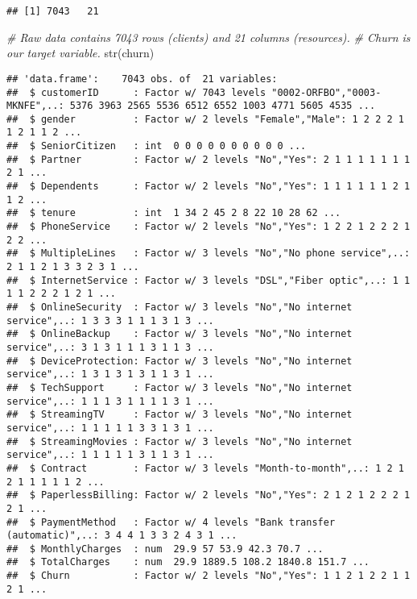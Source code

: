 \documentclass[
]{article}
\newenvironment{Shaded}{\begin{snugshade}}{\end{snugshade}}
\newcommand{\CommentTok}[1]{\textcolor[rgb]{0.56,0.35,0.01}{\textit{#1}}}
\newcommand{\FunctionTok}[1]{\textcolor[rgb]{0.00,0.00,0.00}{#1}}
\newcommand{\NormalTok}[1]{#1}
\begin{document}
\begin{verbatim}
## [1] 7043   21
\end{verbatim}

\begin{Shaded}
\begin{Highlighting}[]
\CommentTok{\# Raw data contains 7043 rows (clients) and 21 columns (resources). }
\CommentTok{\# \textquotesingle{}Churn\textquotesingle{} is our target variable.}
\FunctionTok{str}\NormalTok{(churn)}
\end{Highlighting}
\end{Shaded}

\begin{verbatim}
## 'data.frame':    7043 obs. of  21 variables:
##  $ customerID      : Factor w/ 7043 levels "0002-ORFBO","0003-MKNFE",..: 5376 3963 2565 5536 6512 6552 1003 4771 5605 4535 ...
##  $ gender          : Factor w/ 2 levels "Female","Male": 1 2 2 2 1 1 2 1 1 2 ...
##  $ SeniorCitizen   : int  0 0 0 0 0 0 0 0 0 0 ...
##  $ Partner         : Factor w/ 2 levels "No","Yes": 2 1 1 1 1 1 1 1 2 1 ...
##  $ Dependents      : Factor w/ 2 levels "No","Yes": 1 1 1 1 1 1 2 1 1 2 ...
##  $ tenure          : int  1 34 2 45 2 8 22 10 28 62 ...
##  $ PhoneService    : Factor w/ 2 levels "No","Yes": 1 2 2 1 2 2 2 1 2 2 ...
##  $ MultipleLines   : Factor w/ 3 levels "No","No phone service",..: 2 1 1 2 1 3 3 2 3 1 ...
##  $ InternetService : Factor w/ 3 levels "DSL","Fiber optic",..: 1 1 1 1 2 2 2 1 2 1 ...
##  $ OnlineSecurity  : Factor w/ 3 levels "No","No internet service",..: 1 3 3 3 1 1 1 3 1 3 ...
##  $ OnlineBackup    : Factor w/ 3 levels "No","No internet service",..: 3 1 3 1 1 1 3 1 1 3 ...
##  $ DeviceProtection: Factor w/ 3 levels "No","No internet service",..: 1 3 1 3 1 3 1 1 3 1 ...
##  $ TechSupport     : Factor w/ 3 levels "No","No internet service",..: 1 1 1 3 1 1 1 1 3 1 ...
##  $ StreamingTV     : Factor w/ 3 levels "No","No internet service",..: 1 1 1 1 1 3 3 1 3 1 ...
##  $ StreamingMovies : Factor w/ 3 levels "No","No internet service",..: 1 1 1 1 1 3 1 1 3 1 ...
##  $ Contract        : Factor w/ 3 levels "Month-to-month",..: 1 2 1 2 1 1 1 1 1 2 ...
##  $ PaperlessBilling: Factor w/ 2 levels "No","Yes": 2 1 2 1 2 2 2 1 2 1 ...
##  $ PaymentMethod   : Factor w/ 4 levels "Bank transfer (automatic)",..: 3 4 4 1 3 3 2 4 3 1 ...
##  $ MonthlyCharges  : num  29.9 57 53.9 42.3 70.7 ...
##  $ TotalCharges    : num  29.9 1889.5 108.2 1840.8 151.7 ...
##  $ Churn           : Factor w/ 2 levels "No","Yes": 1 1 2 1 2 2 1 1 2 1 ...
\end{verbatim}
\end{document}

